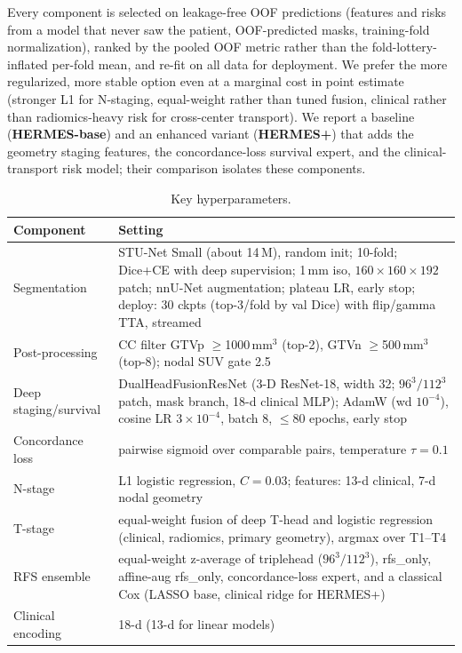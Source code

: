 \documentclass[runningheads]{llncs}
\begin{document}
Every component is selected on leakage-free OOF predictions (features and risks from a model that never saw the patient, OOF-predicted masks, training-fold normalization), ranked by the pooled OOF metric rather than the fold-lottery-inflated per-fold mean, and re-fit on all data for deployment. We prefer the more regularized, more stable option even at a marginal cost in point estimate (stronger L1 for N-staging, equal-weight rather than tuned fusion, clinical rather than radiomics-heavy risk for cross-center transport). We report a baseline (\textbf{HERMES-base}) and an enhanced variant (\textbf{HERMES+}) that adds the geometry staging features, the concordance-loss survival expert, and the clinical-transport risk model; their comparison isolates these components.

\begin{table}[t]
\centering
\caption{Key hyperparameters.}
\label{tab:hyper}
\small
\renewcommand{\arraystretch}{1.1}
\begin{tabular}{p{3.1cm}p{8.3cm}}
\toprule
Component & Setting \\
\midrule
Segmentation & STU-Net Small (about 14\,M), random init; 10-fold; Dice+CE with deep supervision; 1\,mm iso, $160{\times}160{\times}192$ patch; nnU-Net augmentation; plateau LR, early stop; deploy: 30 ckpts (top-3/fold by val Dice) with flip/gamma TTA, streamed \\
Post-processing & CC filter GTVp $\ge$1000\,mm$^3$ (top-2), GTVn $\ge$500\,mm$^3$ (top-8); nodal SUV gate 2.5 \\
Deep staging/survival & DualHeadFusionResNet (3-D ResNet-18, width 32; $96^3/112^3$ patch, mask branch, 18-d clinical MLP); AdamW (wd $10^{-4}$), cosine LR $3\times10^{-4}$, batch 8, $\le$80 epochs, early stop \\
Concordance loss & pairwise sigmoid over comparable pairs, temperature $\tau=0.1$ \\
N-stage & L1 logistic regression, $C=0.03$; features: 13-d clinical, 7-d nodal geometry \\
T-stage & equal-weight fusion of deep T-head and logistic regression (clinical, radiomics, primary geometry), argmax over T1--T4 \\
RFS ensemble & equal-weight z-average of triplehead ($96^3/112^3$), rfs\_only, affine-aug rfs\_only, concordance-loss expert, and a classical Cox (LASSO base, clinical ridge for HERMES+) \\
Clinical encoding & 18-d (13-d for linear models) \\
\bottomrule
\end{tabular}
\end{table}
\end{document}
